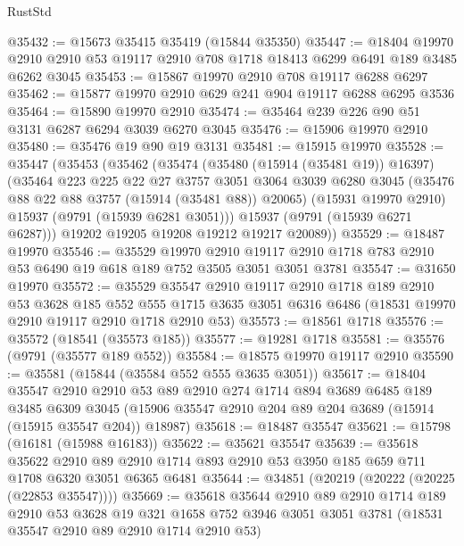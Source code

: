 \begin{lexlean}{RustStd}
\begin{coremodule}
@35432 := @15673 @35415 @35419 (@15844 @35350)
@35447 := @18404
    @19970
    @2910
    @2910
    @53
    @19117
    @2910
    @708
    @1718
    @18413
    @6299
    @6491
    @189
    @3485
    @6262
    @3045
@35453 := @15867 @19970 @2910 @708 @19117 @6288 @6297
@35462 := @15877 @19970 @2910 @629 @241 @904 @19117 @6288 @6295 @3536
@35464 := @15890 @19970 @2910
@35474 := @35464 @239 @226 @90 @51 @3131 @6287 @6294 @3039 @6270 @3045
@35476 := @15906 @19970 @2910
@35480 := @35476 @19 @90 @19 @3131
@35481 := @15915 @19970
@35528 := @35447
    (@35453
      (@35462
        (@35474
          (@35480 (@15914 (@35481 @19)) @16397)
          (@35464
            @223
            @225
            @22
            @27
            @3757
            @3051
            @3064
            @3039
            @6280
            @3045
            (@35476 @88 @22 @88 @3757 (@15914 (@35481 @88)) @20065)
            (@15931 @19970 @2910)
            @15937
            (@9791 (@15939 @6281 @3051)))
          @15937
          (@9791 (@15939 @6271 @6287)))
        @19202
        @19205
        @19208
        @19212
        @19217
        @20089))
@35529 := @18487 @19970
@35546 := @35529
    @19970
    @2910
    @19117
    @2910
    @1718
    @783
    @2910
    @53
    @6490
    @19
    @618
    @189
    @752
    @3505
    @3051
    @3051
    @3781
@35547 := @31650 @19970
@35572 := @35529
    @35547
    @2910
    @19117
    @2910
    @1718
    @189
    @2910
    @53
    @3628
    @185
    @552
    @555
    @1715
    @3635
    @3051
    @6316
    @6486
    (@18531 @19970 @2910 @19117 @2910 @1718 @2910 @53)
@35573 := @18561 @1718
@35576 := @35572 (@18541 (@35573 @185))
@35577 := @19281 @1718
@35581 := @35576 (@9791 (@35577 @189 @552))
@35584 := @18575 @19970 @19117 @2910
@35590 := @35581 (@15844 (@35584 @552 @555 @3635 @3051))
@35617 := @18404
    @35547
    @2910
    @2910
    @53
    @89
    @2910
    @274
    @1714
    @894
    @3689
    @6485
    @189
    @3485
    @6309
    @3045
    (@15906 @35547 @2910 @204 @89 @204 @3689 (@15914 (@15915 @35547 @204)) @18987)
@35618 := @18487 @35547
@35621 := @15798 (@16181 (@15988 @16183))
@35622 := @35621 @35547
@35639 := @35618
    @35622
    @2910
    @89
    @2910
    @1714
    @893
    @2910
    @53
    @3950
    @185
    @659
    @711
    @1708
    @6320
    @3051
    @6365
    @6481
@35644 := @34851 (@20219 (@20222 (@20225 (@22853 @35547))))
@35669 := @35618
    @35644
    @2910
    @89
    @2910
    @1714
    @189
    @2910
    @53
    @3628
    @19
    @321
    @1658
    @752
    @3946
    @3051
    @3051
    @3781
    (@18531 @35547 @2910 @89 @2910 @1714 @2910 @53)

\end{coremodule}
\end{lexlean}
